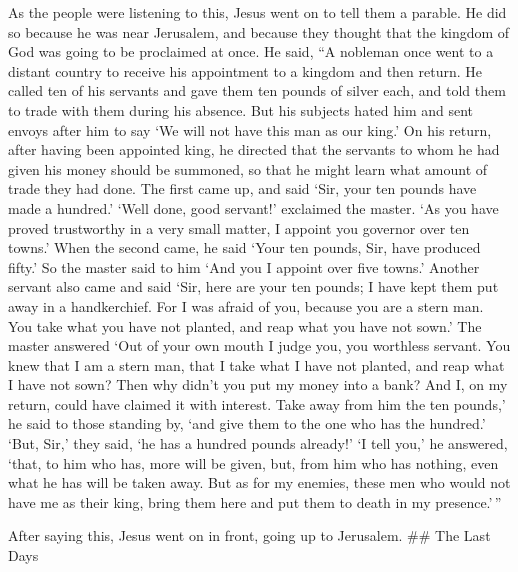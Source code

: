  As the people were listening to this, Jesus went on to
tell them a parable. He did so because he was near Jerusalem, and
because they thought that the kingdom of God was going to be proclaimed
at once.  He said, ``A nobleman once went to a distant
country to receive his appointment to a kingdom and then return.
 He called ten of his servants and gave them ten pounds of
silver each, and told them to trade with them during his absence.
 But his subjects hated him and sent envoys after him to
say `We will not have this man as our king.'  On his
return, after having been appointed king, he directed that the servants
to whom he had given his money should be summoned, so that he might
learn what amount of trade they had done.  The first came
up, and said `Sir, your ten pounds have made a hundred.' 
`Well done, good servant!' exclaimed the master. `As you have proved
trustworthy in a very small matter, I appoint you governor over ten
towns.'  When the second came, he said `Your ten pounds,
Sir, have produced fifty.'  So the master said to him `And
you I appoint over five towns.'  Another servant also came
and said `Sir, here are your ten pounds; I have kept them put away in a
handkerchief.  For I was afraid of you, because you are a
stern man. You take what you have not planted, and reap what you have
not sown.'  The master answered `Out of your own mouth I
judge you, you worthless servant. You knew that I am a stern man, that I
take what I have not planted, and reap what I have not sown?
 Then why didn't you put my money into a bank? And I, on my
return, could have claimed it with interest.  Take away
from him the ten pounds,' he said to those standing by, `and give them
to the one who has the hundred.'  `But, Sir,' they said,
`he has a hundred pounds already!'  `I tell you,' he
answered, `that, to him who has, more will be given, but, from him who
has nothing, even what he has will be taken away.  But as
for my enemies, these men who would not have me as their king, bring
them here and put them to death in my presence.'\,''

 After saying this, Jesus went on in front, going up to
Jerusalem. \#\# The Last Days

